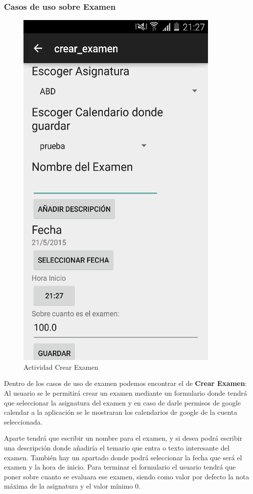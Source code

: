 \subsubsection{Casos de uso sobre Examen}
\label{subsubsecc:Casos de uso sobre Examen}
\begin{figure} 
  \begin{center}
    \includegraphics{figs/crearExamen.png}
  \end{center}
  \caption{Actividad Crear Examen}
\end{figure}
Dentro de los casos de uso de examen podemos encontrar el de \textbf{Crear Examen}:
Al usuario se le permitirá crear un examen mediante un formulario donde tendrá que seleccionar la asignatura del examen y en caso de darle permisos de google calendar a la aplicación se le mostraran los calendarios de google de la cuenta seleccionada.

Aparte tendrá que escribir un nombre para el examen,  y si desea podrá escribir una descripción donde añadiría el temario que entra o texto interesante del examen.
También hay un apartado donde podrá seleccionar la fecha que será el examen y la hora de inicio.
Para terminar el formulario el usuario tendrá que poner sobre cuanto se evaluara ese examen, siendo como valor por defecto la nota máxima de la asignatura y el valor mínimo 0.

